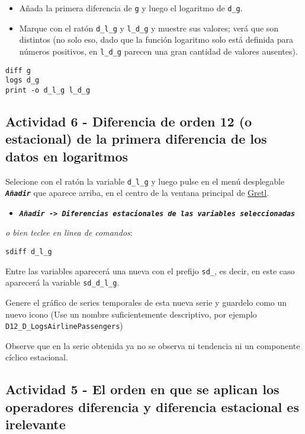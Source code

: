 \documentclass[11pt]{article}
\begin{document}
\begin{itemize}
\item Añada la primera diferencia de \texttt{g} y luego el logaritmo de \texttt{d\_g}.
\item Marque con el ratón \texttt{d\_l\_g} y \texttt{l\_d\_g} y muestre sus valores; verá
que son distintos (no solo eso, dado que la función logaritmo solo
está definida para números positivos, en \texttt{l\_d\_g} parecen una gran
cantidad de valores ausentes).
\end{itemize}

\begin{verbatim}
diff g
logs d_g
print -o d_l_g l_d_g
\end{verbatim}

\subsection{Actividad 6 - Diferencia de orden 12 (o estacional) de la primera diferencia de los datos en logaritmos}
\label{sec:orgb256d47}
Selecione con el ratón la variable \texttt{d\_l\_g} y luego pulse en el menú desplegable \textbf{\emph{\texttt{Añadir}}} que aparece arriba, en el centro de la
ventana principal de \href{https://gretl.sourceforge.net/es.html}{Gretl}.
\begin{itemize}
\item \textbf{\emph{\texttt{Añadir -> Diferencias estacionales de las variables seleccionadas}}}
\end{itemize}

{\vspace{0pt} \footnotesize \color{gray!70!black}
\emph{o bien teclee en linea de comandos}: 
\begin{verbatim}
sdiff d_l_g
\end{verbatim}
}

Entre las variables aparecerá una nueva con el prefijo \texttt{sd\_}, es
decir, en este caso aparecerá la variable \texttt{sd\_d\_l\_g}.

Genere el gráfico de series temporales de esta nueva serie y guardelo
como un nuevo icono (Use un nombre suficientemente descriptivo, por
ejemplo \texttt{D12\_D\_LogsAirlinePassengers})

Observe que en la serie obtenida ya no se observa ni tendencia ni un
componente cíclico estacional.

\subsection{Actividad 5 - El orden en que se aplican los operadores diferencia y diferencia estacional es irelevante}
\label{sec:org077f8e1}
\end{document}
